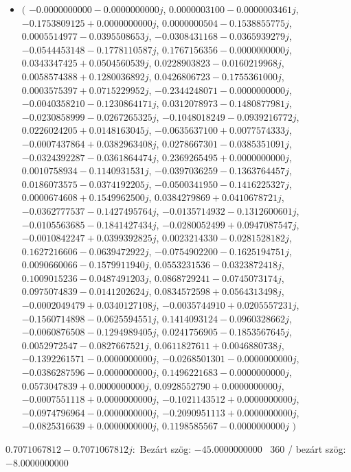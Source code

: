 \documentclass[14pt,a4paper]{article}
\begin{document}
\begin{itemize}
\item
$\big($
$-0.0000000000-0.0000000000j$, $0.0000003100-0.0000003461j$, $-0.1753809125+0.0000000000j$, $0.0000000504-0.1538855775j$, $0.0005514977-0.0395508653j$, $-0.0308431168-0.0365939279j$, $-0.0544453148-0.1778110587j$, $0.1767156356-0.0000000000j$, $0.0343347425+0.0504560539j$, $0.0228903823-0.0160219968j$, $0.0058574388+0.1280036892j$, $0.0426806723-0.1755361000j$, $0.0003575397+0.0715229952j$, $-0.2344248071-0.0000000000j$, $-0.0040358210-0.1230864171j$, $0.0312078973-0.1480877981j$, $-0.0230858999-0.0267265325j$, $-0.1048018249-0.0939216772j$, $0.0226024205+0.0148163045j$, $-0.0635637100+0.0077574333j$, $-0.0007437864+0.0382963408j$, $0.0278667301-0.0385351091j$, $-0.0324392287-0.0361864474j$, $0.2369265495+0.0000000000j$, $0.0010758934-0.1140931531j$, $-0.0397036259-0.1363764457j$, $0.0186073575-0.0374192205j$, $-0.0500341950-0.1416225327j$, $0.0000674608+0.1549962500j$, $0.0384279869+0.0410678721j$, $-0.0362777537-0.1427495764j$, $-0.0135714932-0.1312600601j$, $-0.0105563685-0.1841427434j$, $-0.0280052499+0.0947087547j$, $-0.0010842247+0.0399392825j$, $0.0023214330-0.0281528182j$, $0.1627216606-0.0639472922j$, $-0.0754902200-0.1625194751j$, $0.0090660066-0.1579911940j$, $0.0553231536-0.0323872418j$, $0.1009015236-0.0487491203j$, $0.0868729241-0.0745073174j$, $0.0975074839-0.0141202624j$, $0.0834572598+0.0564313498j$, $-0.0002049479+0.0340127108j$, $-0.0035744910+0.0205557231j$, $-0.1560714898-0.0625594551j$, $0.1414093124-0.0960328662j$, $-0.0060876508-0.1294989405j$, $0.0241756905-0.1853567645j$, $0.0052972547-0.0827667521j$, $0.0611827611+0.0046880738j$, $-0.1392261571-0.0000000000j$, $-0.0268501301-0.0000000000j$, $-0.0386287596-0.0000000000j$, $0.1496221683-0.0000000000j$, $0.0573047839+0.0000000000j$, $0.0928552790+0.0000000000j$, $-0.0007551118+0.0000000000j$, $-0.1021143512+0.0000000000j$, $-0.0974796964-0.0000000000j$, $-0.2090951113+0.0000000000j$, $-0.0825316639+0.0000000000j$, $0.1198585567-0.0000000000j$
$\big)$
\end{itemize}
$0.7071067812-0.7071067812j$:\
Bezárt szög: $-45.0000000000$ \
360 / bezárt szög: $-8.0000000000$\
\end{document}
